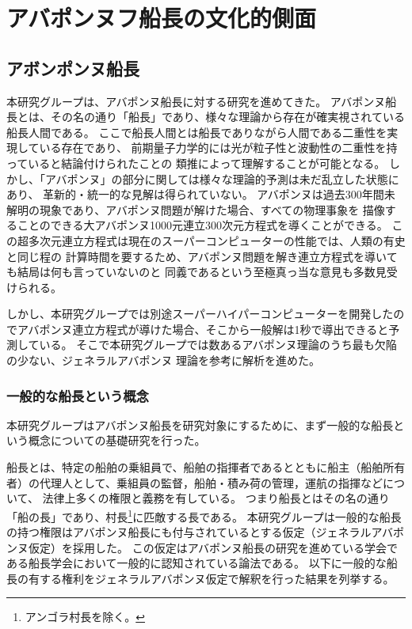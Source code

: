 \documentclass[12pt]{jsarticle}
\begin{document}
\section{アバポンヌフ船長の文化的側面}
\subsection{アボンポンヌ船長}
本研究グループは、アバポンヌ船長に対する研究を進めてきた。
アバポンヌ船長とは、その名の通り「船長」であり、様々な理論から存在が確実視されている船長人間である。
ここで船長人間とは船長でありながら人間である二重性を実現している存在であり、
前期量子力学的には光が粒子性と波動性の二重性を持っていると結論付けられたことの
類推によって理解することが可能となる。
しかし、「アバポンヌ」の部分に関しては様々な理論的予測は未だ乱立した状態にあり、
革新的・統一的な見解は得られていない。
アバポンヌは過去300年間未解明の現象であり、アバポンヌ問題が解けた場合、すべての物理事象を
描像することのできる大アバポンヌ1000元連立300次元方程式を導くことができる。
この超多次元連立方程式は現在のスーパーコンピューターの性能では、人類の有史と同じ程の
計算時間を要するため、アバポンヌ問題を解き連立方程式を導いても結局は何も言っていないのと
同義であるという至極真っ当な意見も多数見受けられる。\par

しかし、本研究グループでは別途スーパーハイパーコンピューターを開発したのでアバポンヌ連立方程式が導けた場合、そこから一般解は1秒で導出できると予測している。
そこで本研究グループでは数あるアバポンヌ理論のうち最も欠陥の少ない、ジェネラルアバポンヌ
理論を参考に解析を進めた。

\subsubsection{一般的な船長という概念}
本研究グループはアバポンヌ船長を研究対象にするために、まず一般的な船長という概念についての基礎研究を行った。\par
船長とは、特定の船舶の乗組員で、船舶の指揮者であるとともに船主（船舶所有者）の代理人として、乗組員の監督，船舶・積み荷の管理，運航の指揮などについて、
法律上多くの権限と義務を有している。
つまり船長とはその名の通り「船の長」であり、村長\footnote{アンゴラ村長を除く。}に匹敵する長である。
本研究グループは一般的な船長の持つ権限はアバポンヌ船長にも付与されているとする仮定（ジェネラルアバポンヌ仮定）を採用した。
この仮定はアバポンヌ船長の研究を進めている学会である船長学会において一般的に認知されている論法である。
以下に一般的な船長の有する権利をジェネラルアバポンヌ仮定で解釈を行った結果を列挙する。
\end{document}
